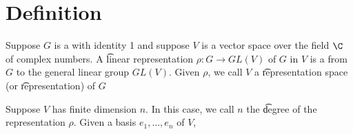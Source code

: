 
\section*{Definition}

Suppose $G$ is a with identity 1 and suppose $V$ is a vector space over the field $\C $ of complex numbers.
A \t{linear representation} $\rho : G \to GL(V)$ of $G$ in $V$ is a from $G$ to the general linear group $GL(V)$.
Given $\rho $, we call $V$ a \t{representation space} (or \t{representation}) of $G$

Suppose $V$ has finite dimension $n$.
In this case, we call $n$ the \t{degree} of the representation $\rho $.
Given a basis $e_1, \dots , e_n$ of $V$,

\blankpage